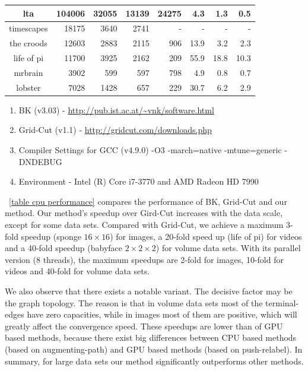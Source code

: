 \begin{table}
{\begin{tabular}{@{ }c|r|r@{ }r|r@{ }r@{ }r@{ }r@{ }}
    lta         & 104006    & 32055  & 13139   & 24275 & 4.3   & 1.3    & 0.5\\
    \hline
    timescapes  & 18175     & 3640   & 2741    & -     & -     & -      & -\\
    the croods  & 12603     & 2883   & 2115    & 906   & 13.9  & 3.2    & 2.3\\
    life of pi  & 11700     & 3925   & 2162    & 209   & 55.9  & 18.8   & 10.3\\
    \hline
    mrbrain     & 3902      & 599    & 597     & 798   & 4.9   & 0.8    & 0.7\\
    lobster     & 7028      & 1428   & 657     & 229   & 30.7  & 6.2    & 2.9\\
    \hline
    \end{tabular}
    \begin{tablenotes}
        \item {
        \begin{enumerate}
            \item BK (v3.03) - \url{http://pub.ist.ac.at/~vnk/software.html}
            \item Grid-Cut (v1.1) - \url{http://gridcut.com/downloads.php}
            \item Compiler Settings for GCC (v4.9.0) -O3 -march=native -mtune=generic -DNDEBUG
            \item Environment - Intel (R) Core i7-3770 and AMD Radeon HD 7990
        \end{enumerate}}
    \end{tablenotes}
}
\end{table}

\tablename \ \ref{table cpu performance} compares the performance of BK, Grid-Cut and our method.
Our method's speedup over Gird-Cut increases with the data scale, except for some data sets.
Compared with Grid-Cut, we achieve a maximum 3-fold speedup (sponge $16 \times 16$) for images, a 20-fold speed up (life of pi) for videos and a 40-fold speedup (babyface $2 \times 2 \times 2$) for volume data sets.
With its parallel version (8 threads), the maximum speedups are 2-fold for images, 10-fold for videos and 40-fold for volume data sets.

We also observe that there exists a notable variant.
The decisive factor may be the graph topology.
The reason is that in volume data sets most of the terminal-edges have zero capacities, while in images most of them are positive, which will greatly affect the convergence speed.
These speedups are lower than of GPU based methods, because there exist big differences between CPU based methods (based on augmenting-path) and GPU based methods (based on push-relabel).
In summary, for large data sets our method significantly outperforms other methods.

